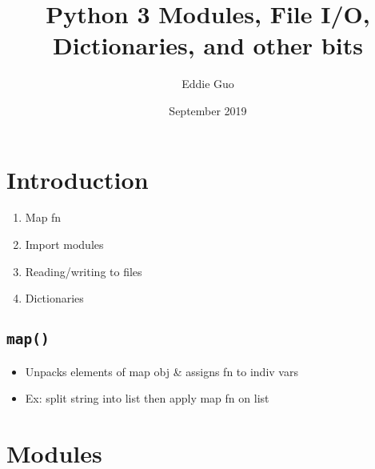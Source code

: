 \documentclass{article}
\title{Python 3 Modules, File I/O, Dictionaries, and other bits}
\author{Eddie Guo}
\date{September 2019}
\begin{document}
\lstset{language=Python}
\maketitle

\section{Introduction}
    \begin{multicols}{2}
        \begin{enumerate}[label=(\roman*)]
            \item Map fn
            \item Import modules
            \item Reading/writing to files
            \item Dictionaries
        \end{enumerate}
    \end{multicols}

\subsection{\texttt{map()}}
    \begin{itemize}
        \item Unpacks elements of map obj \& assigns fn to indiv vars
        \item Ex: split string into list then apply map fn on list
    \end{itemize}

\section{Modules}
\end{document}
